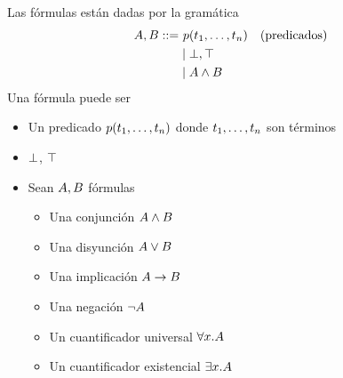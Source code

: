 \begin{definition}[Fórmulas]
    Las fórmulas están dadas por la gramática
    \begin{align*}
        A, B ::=&\ p(t_1, \dots, t_n)
        &&(\text{predicados})\\
        &\mid \bot, \top\\
        &\mid A \wedge B
    \end{align*}
    Una fórmula puede ser
    \begin{itemize}
        \item Un predicado $p(t_1, \dots, t_n)$ donde $t_1, \dots,
        t_n$ son términos
        \item $\bot$, $\top$
        \item Sean $A, B$ fórmulas
        \begin{itemize}
            \item Una conjunción $A \wedge B$
            \item Una disyunción $A \vee B$
            \item Una implicación $A \to B$
            \item Una negación $\neg A$
            \item Un cuantificador universal $\forall x . A$
            \item Un cuantificador existencial $\exists x . A$
        \end{itemize}
    \end{itemize}
\end{definition}

